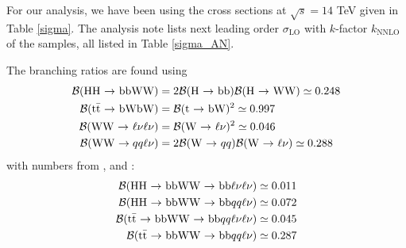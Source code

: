 \documentclass[10pt,a4paper]{article}
\renewcommand{\tt}{\ensuremath{\text{t}\bar{\text{t}}}}
\newcommand{\lnu}{$\ell\nu$}
\newcommand{\BR}{\mathcal{B}}
\begin{document}
For our analysis, we have been using the cross sections at $\sqrt{s}=14$ TeV given in Table \ref{sigma}. The analysis note lists next leading order $\sigma_\text{LO}$ with $k$-factor $k_\text{NNLO}$ of the samples, all listed in Table \ref{sigma_AN}. %

The branching ratios are found using
\begin{align*}
    \mathcal{B}(\text{HH $\rightarrow$ bbWW})
        &= 2\mathcal{B}(\text{H $\rightarrow$ bb})
            \mathcal{B}(\text{H $\rightarrow$ WW})
        \simeq 0.248 \\
    \mathcal{B}(\text{\tt\ $\rightarrow$ bWbW})
        &= \mathcal{B}(\text{t $\rightarrow$ bW})^2
        \simeq 0.997 \\
    \mathcal{B}(\text{WW $\rightarrow$ \lnu\lnu})
        &= \mathcal{B}(\text{W $\rightarrow$ \lnu})^2
        \simeq 0.046 \\
    \mathcal{B}(\text{WW $\rightarrow qq$\lnu})
        &= 2\mathcal{B}(\text{W $\rightarrow$ $qq$})
            \mathcal{B}(\text{W $\rightarrow$ \lnu})
        \simeq 0.288
\end{align*}
with numbers from \cite{BR_HH}, \cite{BR_tt} and \cite{BR_W}:
\begin{align*}
    \mathcal{B}(\text{HH $\rightarrow$ bbWW $\rightarrow$ bb\lnu\lnu})
         &\simeq 0.011\\
    \mathcal{B}(\text{HH $\rightarrow$ bbWW $\rightarrow$ bb$qq$\lnu})
         &\simeq 0.072\\
    \mathcal{B}(\text{\tt\ $\rightarrow$ bbWW $\rightarrow$ bb$qq$\lnu\lnu})
         &\simeq 0.045\\
    \mathcal{B}(\text{\tt\ $\rightarrow$ bbWW $\rightarrow$ bb$qq$\lnu})
         &\simeq 0.287
\end{align*}
\end{document}
